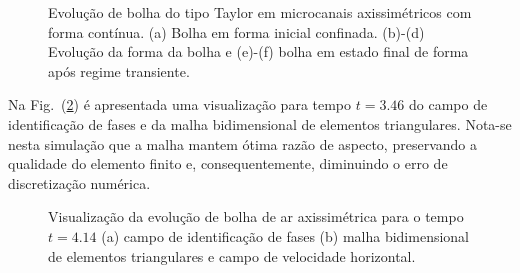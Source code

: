 \documentclass[a4paper,portuges,12pt]{article}
\begin{document}
\begin{figure}[!h]
\begin{center}
	\end{center}
   \caption{Evolução de bolha do tipo Taylor em microcanais
   axissimétricos com forma contínua. (a) Bolha em forma inicial
   confinada. (b)-(d) Evolução da forma da bolha e (e)-(f) bolha em
   estado final de forma após regime transiente.} 
   \label{fig:taylor1} 
\end{figure}

Na Fig.~(\ref{fig:taylor2}) é apresentada uma visualização para tempo
$t=3.46$ do campo de identificação de fases e da malha bidimensional de
elementos triangulares. Nota-se nesta simulação que a malha mantem
ótima razão de aspecto, preservando a qualidade do elemento finito
e, consequentemente, diminuindo o erro de discretização numérica.

\begin{figure}[!h]
	\begin{center}
		\hspace{0.7cm}
	\end{center}
   \caption{Visualização da evolução de bolha de ar axissimétrica para
   o tempo $t=4.14$ (a) campo de identificação de fases (b) malha
   bidimensional de elementos triangulares e campo de velocidade
   horizontal.} 
   \label{fig:taylor2} 
\end{figure}
\end{document}
